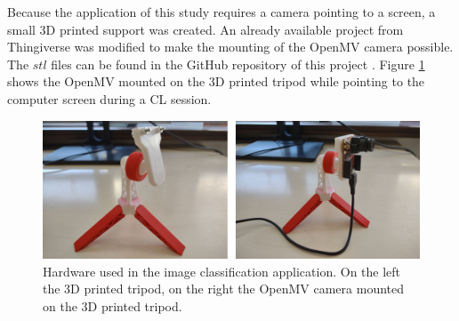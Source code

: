 \documentclass[12pt]{report}
\begin{document}
Because the application of this study requires a camera pointing to a screen, a small 3D printed support was created. An already available project from Thingiverse \cite{tripod_link} was modified to make the mounting of the OpenMV camera possible. The $stl$ files can be found in the GitHub repository of this project \cite{github_repo}. Figure \ref{fig:hardware_openmv} shows the OpenMV mounted on the 3D printed tripod while pointing to the computer screen during a CL session.\\

\begin{figure}[h!]
    \centering
    \includegraphics[width=120mm]{Figures/Chapter2/hardware_openmv.jpg} 
    \caption{Hardware used in the image classification application. On the left the 3D printed tripod, on the right the OpenMV camera mounted on the 3D printed tripod.}
    \label{fig:hardware_openmv}    
\end{figure}
\end{document}
